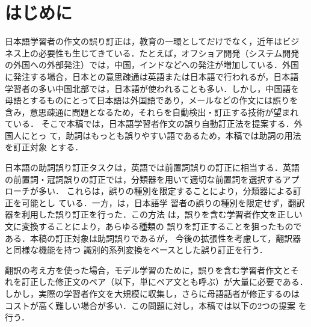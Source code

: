 \documentclass[japanese]{jnlp_1.4}
\begin{document}
\maketitle


\section{はじめに}

日本語学習者の作文の誤り訂正は，教育の一環としてだけでなく，近年はビジ
ネス上の必要性も生じてきている．たとえば，オフショア開発（システム開発
の外国への外部発注）では，中国，インドなどへの発注が増加している．外国
に発注する場合，日本との意思疎通は英語または日本語で行われるが，日本語
学習者の多い中国北部では，日本語が使われることも多い．しかし，中国語を
母語とするものにとって日本語は外国語であり，メールなどの作文には誤りを
含み，意思疎通に問題となるため，それらを自動検出・訂正する技術が望まれ
ている．
そこで本稿では，日本語学習者作文の誤り自動訂正法を提案する．外国人にとっ
て，助詞はもっとも誤りやすい語であるため，本稿では助詞の用法を訂正対象
とする．

日本語の助詞誤り訂正タスクは，英語では前置詞誤りの訂正に相当する．英語
の前置詞・冠詞誤りの訂正では，分類器を用いて適切な前置詞を選択するアプ
ローチが多い．
これらは，誤りの種別を限定することにより，分類器による訂正を可能とし
ている．一方，は，日本語学
習者の誤りの種別を限定せず，翻訳器を利用した誤り訂正を行った．この方法
は，誤りを含む学習者作文を正しい文に変換することにより，あらゆる種類の
誤りを訂正することを狙ったものである．本稿の訂正対象は助詞誤りであるが，
今後の拡張性を考慮して，翻訳器と同様な機能を持つ
識別的系列変換をベースとした誤り訂正を行う．

翻訳の考え方を使った場合，モデル学習のために，誤りを含む学習者作文とそ
れを訂正した修正文のペア（以下，単にペア文とも呼ぶ）が大量に必要である．
しかし，実際の学習者作文を大規模に収集し，さらに母語話者が修正するのは
コストが高く難しい場合が多い．この問題に対し，本稿では以下の2つの提案
を行う．
\end{document}
